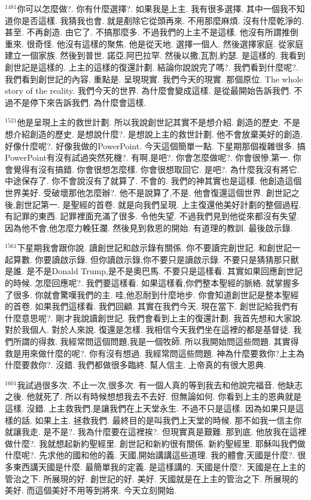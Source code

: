 \documentclass{book}
\begin{document}
$^{1481}$你可以怎麼做?.
你有什麼選擇?.
如果我是上主.
我有很多選擇.
其中一個我不知道你是否這樣.
我猜我也會.
就是剷除它從頭再來.
不用那麼麻煩.
沒有什麼乾淨的.
甚至.
不再創造.
由它了.
不搞那麼多.
不過我們的上主不是這樣.
他沒有所謂推倒重來.
很奇怪.
他沒有這樣的聚焦.
他是從天地.
選擇一個人.
然後選擇家庭.
從家庭建立一個家族.
然後到普世.
諾亞,阿巴拉罕.
然後以撒,瓦割,約瑟.
是這樣的.
我看到創世記是這樣的.
上主的這樣的復還計劃.
結論你說說完了嗎?.
我們看到什麼呢?.
我們看到創世記的內容.
重點是.
呈現現實.
我們今天的現實.
那個原位.
The whole story of the reality.
我們今天的世界.
為什麼會變成這樣.
是從最開始告訴我們.
不過不是停下來告訴我們.
為什麼會這樣.

$^{1521}$他是呈現上主的救世計劃.
所以我說創世記其實不是想介紹.
創造的歷史.
不是想介紹創造的歷史.
是想說什麼?.
是想說上主的救世計劃.
他不會放棄美好的創造.
好像什麼呢?.
好像我做的PowerPoint.
今天這個簡單一點.
下星期那個複雜很多.
搞PowerPoint有沒有試過突然死機?.
有啊,是吧?.
你會怎麼做呢?.
你會很慘,第一.
你會覺得有沒有搞錯.
你會很想怎麼樣.
你會很想取回它.
是吧?.
為什麼我沒有將它.
中途保存了.
你不會說沒有了就算了.
不會的.
我們的神其實也是這樣.
他創造這個世界美好.
受破壞那他怎麼辦?.
他不是說算了,不是.
他會復還這個世界.
創世記之後,創世記第一.
是聖經的首卷.
就是向我們呈現.
上主復還他美好計劃的整個過程.
有記罪的東西.
記罪裡面充滿了很多.
令他失望.
不過我們見到他從來都沒有失望.
因為他不會,他怎麼力輓狂瀾.
然後見到救恩的開始.
有道理的教訓.
最後啟示錄.

$^{1561}$下星期我會跟你說.
讀創世記和啟示錄有關係.
你不要讀完創世記.
和創世記一起算數.
你要讀啟示錄.
但你讀啟示錄,你不要只是讀啟示錄.
不要只是猜猜那只獸是誰.
是不是Donald Trump,是不是奧巴馬.
不要只是這樣看.
其實如果回應創世記的時候.
怎麼回應呢?.
我們要這樣看.
如果這樣看,你們整本聖經的脈絡.
就掌握多了很多.
你就會驚嘆我們的主.
哇,他忍耐到什麼地步.
你會知道創世記是整本聖經的首卷.
如果我們這樣看.
我們回顧.
其實在我們今天.
現在當下.
創世記給我們有什麼意思呢?.
剛才我說讀創世記.
我們會看到上主的復還計劃.
我首先想和大家說.
對於我個人.
對於人來說.
復還是怎樣.
我相信今天我們坐在這裡的都是基督徒.
我們所謂的得救.
我經常問這個問題,我是一個牧師.
所以我開始問這些問題.
其實得救是用來做什麼的呢?.
你有沒有想過.
我經常問這些問題.
神為什麼要救你?上主為什麼要救你?.
沒錯.
我們都做很多臨終.
幫人信主.
上帝真的有很大恩典.

$^{1601}$我試過很多次.
不止一次,很多次.
有一個人真的等到我去和他說完福音.
他缺志之後.
他就死了.
所以有時候想想我去不去好.
但無論如何.
你看到上主的恩典就是這樣.
沒錯.
上主救我們,是讓我們在上天堂永生.
不過不只是這樣.
因為如果只是這樣的話.
如果上主.
拯救我們.
最終目的是叫我們上天堂的時候.
那不如我一信主你就讓我走.
是不是?.
我為什麼要在這裡挨?.
但現實真是艱難.
那到底.
他放我在這裡做什麼?.
我就想起新約聖經里.
創世記和新約很有關係.
新約聖經里.
耶穌叫我們做什麼呢?.
先求他的國和他的義.
天國,開始講講這些道理.
我的體會,天國是什麼?.
很多東西講天國是什麼.
最簡單我的定義.
是這樣講的.
天國是什麼?.
天國是在上主的管治之下.
所展現的好.
創世記的好.
美好.
天國就是在上主的管治之下.
所展現的美好.
而這個美好不用等到將來.
今天立刻開始.
\end{document}
